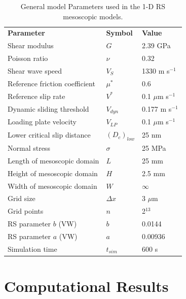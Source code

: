 \documentclass[final,3p, 11pt,authoryear]{elsarticle}
\begin{document}
\begin{table}[ht]
	\centering
	\caption{General model Parameters used in the 1-D RS mesoscopic models.}
	\begin{tabular}{ m{5cm} m{2cm} m{4cm}} 
		\hline  
		\bf{Parameter} 			& \bf{Symbol} 		& \bf{Value}	\\
		Shear modulus  			& $G$  		 	& 2.39 GPa		\\
		Poisson ratio  			& $\nu$  	 	& 0.32 		\\
		Shear wave speed		& $V_{S}$      		& 1330 m s$^{-1}$	\\
		Reference friction coefficient	& $\mu^{*}$	        & 0.6	\\
		Reference slip rate  		& $V^{*}$     		&  0.1 $\mu$m s$^{-1}$\\
		Dynamic sliding threshold   	& $V_{dyn}$  		& 0.177 m s$^{-1}$ \\
		Loading plate velocity  	& $V_{LP}$     		&  0.1 $\mu$m s$^{-1}$\\
		Lower critical slip distance 	& $\left(D_{c}\right)_{low}$    &  25 nm\\
		Normal stress 			& $\sigma$  		&  25 MPa \\
		Length of mesoscopic domain 	&   $L$  		& 25 mm\\
		Height of mesoscopic domain 	&   $H$  		& 2.5 mm\\
		Width of mesoscopic domain 	&   $W$   		& $\infty$\\
		Grid size 			& $\Delta x$ 		& 3 $\mu$m \\
		Grid points 			& $n$ 			& 2$^{13}$ \\
		RS parameter $b$ (VW)  		& $b$ 			& 0.0144  \\
		RS parameter $a$ (VW)  		& $a$ 			& 0.00936  \\
	    Simulation time 			& $t_{sim}$ 		& 600 s  \\
		\hline  	
	\end{tabular}
	\label{table1}
\end{table}

\section{Computational Results}
\end{document}

